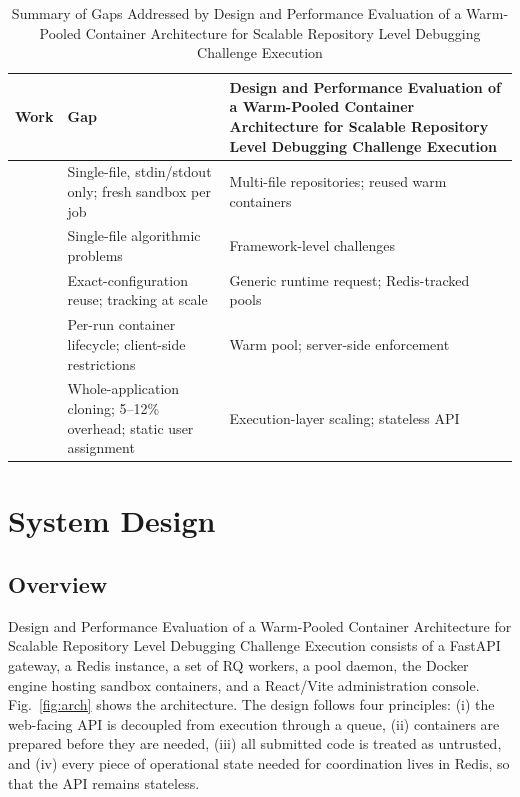 \documentclass[conference]{IEEEtran}
\begin{document}
\begin{table}[t]
\centering
\caption{Summary of Gaps Addressed by Design and Performance Evaluation of a Warm-Pooled Container Architecture for Scalable Repository Level Debugging Challenge Execution}
\label{tab:gaps}
\renewcommand{\arraystretch}{1.15}
\begin{tabular}{p{0.9cm}p{3.3cm}p{3.0cm}}
\toprule
Work & Gap & Design and Performance Evaluation of a Warm-Pooled Container Architecture for Scalable Repository Level Debugging Challenge Execution \\
\midrule
\cite{dosilovic2020} & Single-file, stdin/stdout only; fresh sandbox per job & Multi-file repositories; reused warm containers \\
\cite{kim2022} & Single-file algorithmic problems & Framework-level challenges \\
\cite{suo2021} & Exact-configuration reuse; tracking at scale & Generic runtime request; Redis-tracked pools \\
\cite{docker_oj} & Per-run container lifecycle; client-side restrictions & Warm pool; server-side enforcement \\
\cite{metaoj} & Whole-application cloning; 5--12\% overhead; static user assignment & Execution-layer scaling; stateless API \\
\bottomrule
\end{tabular}
\end{table}

\section{System Design}

\subsection{Overview}
Design and Performance Evaluation of a Warm-Pooled Container Architecture for Scalable Repository Level Debugging Challenge Execution consists of a FastAPI gateway, a Redis instance, a set of RQ workers, a pool daemon, the Docker engine hosting sandbox containers, and a React/Vite administration console. Fig.~\ref{fig:arch} shows the architecture. The design follows four principles: (i) the web-facing API is decoupled from execution through a queue, (ii) containers are prepared before they are needed, (iii) all submitted code is treated as untrusted, and (iv) every piece of operational state needed for coordination lives in Redis, so that the API remains stateless.
\end{document}
